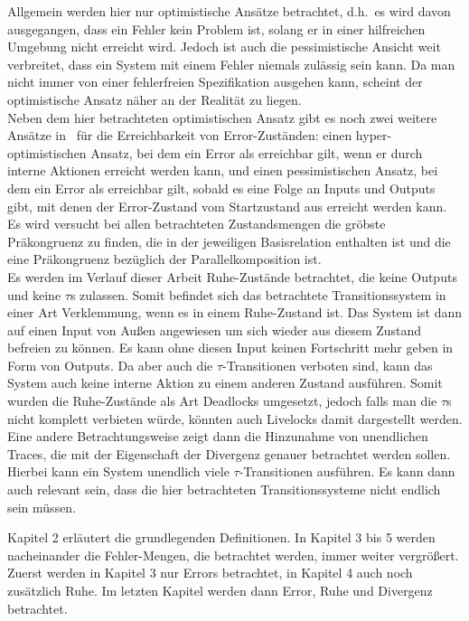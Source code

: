 Allgemein werden hier nur optimistische Ansätze betrachtet, d.h.\ es wird davon
ausgegangen, dass ein Fehler kein Problem ist, solang er in einer hilfreichen
Umgebung nicht erreicht wird. Jedoch ist auch die pessimistische Ansicht weit
verbreitet, dass ein System mit einem Fehler niemals zulässig sein kann. Da man
nicht immer von einer fehlerfreien Spezifikation ausgehen kann, scheint der
optimistische Ansatz näher an der Realität zu liegen.\\
Neben dem hier betrachteten optimistischen Ansatz gibt es noch zwei weitere
Ansätze in~\cite{Vogler2014EIO} für die Erreichbarkeit von Error-Zuständen:
einen hyper-optimistischen Ansatz, bei dem ein Error als erreichbar gilt, wenn
er durch interne Aktionen erreicht werden kann, und einen pessimistischen
Ansatz, bei dem ein Error als erreichbar gilt, sobald es eine Folge an Inputs
und Outputs gibt, mit denen der Error-Zustand vom Startzustand aus erreicht
werden kann.\\
Es wird versucht bei allen betrachteten Zustandsmengen die gröbste Präkongruenz zu
finden, die in der jeweiligen Basisrelation enthalten ist und die eine
Präkongruenz bezüglich der Parallelkomposition ist.\\
Es werden im Verlauf dieser Arbeit Ruhe-Zustände betrachtet, die keine Outputs
und keine $\tau$s zulassen. Somit befindet sich das betrachtete
Transitionssystem in einer Art Verklemmung, wenn es in einem Ruhe-Zustand ist.
Das System ist dann auf einen Input von Außen angewiesen um sich wieder aus
diesem Zustand befreien zu können. Es kann ohne diesen Input keinen Fortschritt
mehr geben in Form von Outputs. Da aber auch die $\tau$-Transitionen verboten
sind, kann das System auch keine interne Aktion zu einem anderen Zustand
ausführen. Somit wurden die Ruhe-Zustände als Art Deadlocks umgesetzt,
jedoch falls man die $\tau$s nicht komplett verbieten würde, könnten auch
Livelocks damit dargestellt werden.\\
Eine andere Betrachtungsweise zeigt dann die Hinzunahme von unendlichen Traces,
die mit der Eigenschaft der Divergenz genauer betrachtet werden sollen. Hierbei
kann ein System unendlich viele $\tau$-Transitionen ausführen. Es kann dann
auch relevant sein, dass die hier betrachteten Transitionssysteme nicht endlich sein
müssen.

Kapitel 2 erläutert die grundlegenden Definitionen. In Kapitel 3 bis 5 werden
nacheinander die Fehler-Mengen, die betrachtet werden, immer weiter vergrößert.
Zuerst werden in Kapitel 3 nur Errors betrachtet, in Kapitel 4 auch noch
zusätzlich Ruhe. Im letzten Kapitel werden dann Error, Ruhe und Divergenz
betrachtet.
